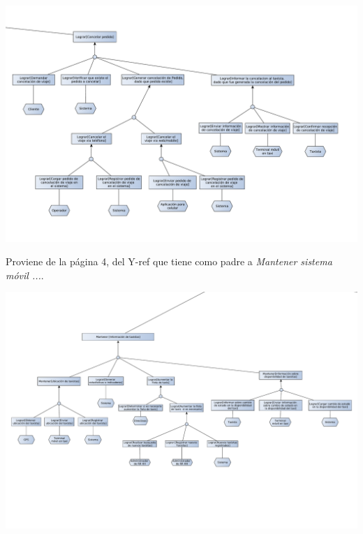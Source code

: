 \documentclass[a4paper]{article}
\begin{document}
\begin{center}
\newpage
\includegraphics[width=1.3\textwidth,keepaspectratio,angle=90]{diag_objetivos_partido/diag_objetivos_4.pdf}
\begin{flushleft}
Proviene de la p\'agina 4, del Y-ref que tiene como padre a \textit{Mantener sistema m\'ovil ...}.
\end{flushleft}
\includegraphics[width=1.3\textwidth,keepaspectratio,angle=90]{diag_objetivos_partido/diag_objetivos_3.pdf}


\end{center}
\end{document}
